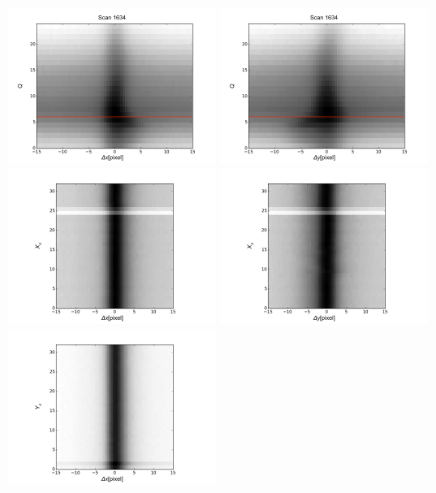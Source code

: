 \documentclass[12pt, preprint]{aastex61}
\begin{document}
\begin{figure}[p]
\begin{center}
\includegraphics[width=0.49\textwidth]{figures/q-x_tot-new}
\includegraphics[width=0.49\textwidth]{figures/q-y_tot-new}
\includegraphics[width=0.49\textwidth]{figures/xa-x_tot-new}
\includegraphics[width=0.49\textwidth]{figures/xa-y_tot-new}
\includegraphics[width=0.49\textwidth]{figures/ya-x_tot-new}

\end{center}
\end{figure}
\end{document}
